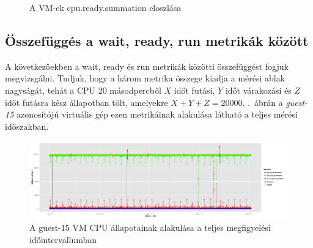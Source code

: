 \documentclass[a4paper,10pt,titlepage]{article}
\begin{document}
\begin{figure}[h!]
  \centering
  \caption{A VM-ek cpu.ready.summation eloszlása}
  \label{fig:cpu_ready_summation_histograms}
\end{figure}

\subsection{Összefüggés a wait, ready, run metrikák között}

A következőekben a wait, ready és run metrikák közötti összefüggést fogjuk megvizsgálni. Tudjuk, hogy a három metrika összege kiadja a mérési ablak nagyságát, tehát a CPU 20 másodpercből $X$ időt futási, $Y$ időt várakozási és $Z$ időt futásra kész állapotban tölt, amelyekre $X+Y+Z=20000$. .~ábrán a \textit{guest-15} azonosítójú virtuális gép ezen metrikáinak alakulása látható a teljes mérési időszakban.

\begin{figure}[h!]
\centering
\includegraphics[width=1.00\textwidth]{figures/cpu_run_wait_ready-guest-15-20120826230140-20120924083120.png}
\caption{ A guest-15 VM CPU állapotainak alakulása a teljes megfigyelési időintervallumban \label{fig:cpu_run_wait_ready-guest-15-01}}
\end{figure}
\end{document}
